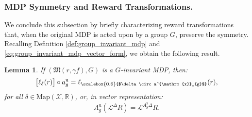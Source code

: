 \documentclass[10pt,leqno]{amsart}
\newcommand{\repr}[1]{a^{#1}}
\newcommand{\reprarg}[2]{\repr{#1}_{#2}}
\newcommand{\R}{\mathbb{R}}
\newcommand{\X}{\mathcal{X}}
\newcommand{\cost}{r}
\newcommand{\Cost}{R}
\newcommand{\f}{f}
\newcommand{\disc}{\gamma}
\newcommand{\maps}{\text{Map}}
\newcommand{\actAdvsym}{\ell}
\newcommand{\actAdv}[1]{\actAdvsym_{#1}}
\newcommand{\mdp}{\mathfrak{M}}
\newcommand{\mdparg}[2]{\mdp\left(#1, #2\right)}
\newtheorem{lemma}[theorem]{Lemma}
\begin{document}
\subsubsection*{MDP Symmetry and Reward Transformations.}
We conclude this subsection by briefly characterizing reward transformations that, when the original MDP is acted upon by a group $G$, preserve the symmetry. Recalling Definition \ref{def:group_invariant_mdp} and \eqref{eq:group_invariant_mdp_vector_form}, we obtain the following result.
\begin{lemma}\label{lem:reward_transform_group_invariant_mdp}
    If $(\mdparg{\cost}{\disc \f}, G)$ is a $G$-invariant MDP, then:
    \begin{align}
        \bigl[\actAdv{\delta}(\cost)\bigr] \circ \reprarg{\mathrm{u}}{g} = \actAdv{\scalebox{0.6}{$\delta \circ \reprarg{\mathrm{x}}{g}$}}(\cost),
    \end{align}
    for all $\delta \in \maps(\X, \R)$, or, in vector representation:
    \begin{align}
        A_g^{\mathrm{u}}\left( \mathcal{L}^\Delta \Cost\right) = \mathcal{L}^{A_g^{\mathrm{x}}\Delta} \Cost.
    \end{align}
\end{lemma}
\end{document}
